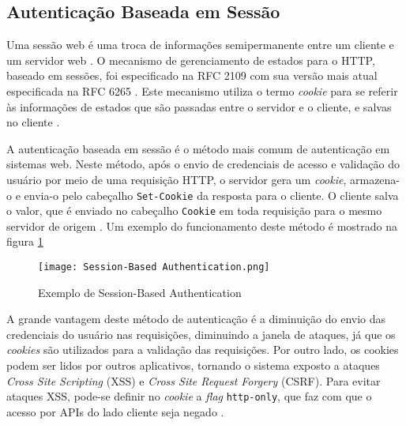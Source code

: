 \subsection{Autenticação Baseada em Sessão}

Uma sessão web é uma troca de informações semipermanente entre um cliente e um servidor web \cite{CALZAVARA2017}. O mecanismo de gerenciamento de estados para o HTTP, baseado em sessões, foi especificado na RFC 2109 \cite{RFC2109} com sua versão mais atual especificada na RFC 6265 \cite{RFC6265}. Este mecanismo utiliza o termo \emph{cookie} para se referir às informações de estados que são passadas entre o servidor e o cliente, e salvas no cliente \cite{RFC2109}. 

A autenticação baseada em sessão é o método mais comum de autenticação em sistemas web. Neste método, após o envio de credenciais de acesso e validação do usuário por meio de uma requisição HTTP, o servidor gera um \emph{cookie}, armazena-o e envia-o pelo cabeçalho \texttt{Set-Cookie} da resposta para o cliente. O cliente salva o valor, que é enviado no cabeçalho \texttt{Cookie} em toda requisição para o mesmo servidor de origem \cite{PAPATHANASAKI2022}. Um exemplo do funcionamento deste método é mostrado na figura \ref{fig:sessionAuth}

\begin{figure}[ht]
  \centering
  \texttt{[image: Session-Based Authentication.png]}
  \caption{Exemplo de Session-Based Authentication}
  \label{fig:sessionAuth}
\end{figure}

A grande vantagem deste método de autenticação é a diminuição do envio das credenciais do usuário nas requisições, diminuindo a janela de ataques, já que os \emph{cookies} são utilizados para a validação das requisições. Por outro lado, os cookies podem ser lidos por outros aplicativos, tornando o sistema exposto a ataques \emph{Cross Site Scripting} (XSS) e \emph{Cross Site Request Forgery} (CSRF). Para evitar ataques XSS, pode-se definir no \emph{cookie} a \emph{flag} \texttt{http-only}, que faz com que o acesso por APIs do lado cliente seja negado \cite{PAPATHANASAKI2022}.